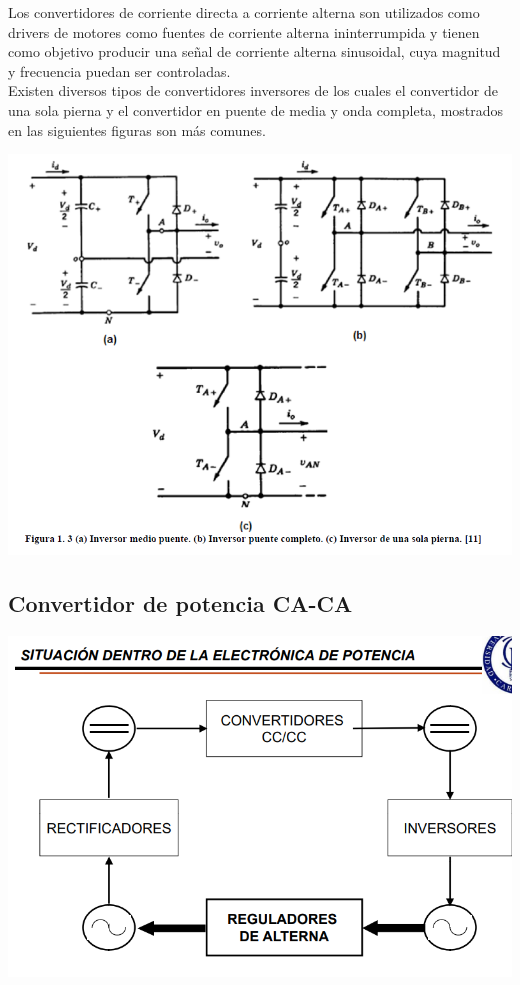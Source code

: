 \documentclass[12pt,a4paper]{article}
\begin{document}
Los convertidores de corriente directa a corriente alterna son utilizados como drivers de motores como fuentes de corriente alterna ininterrumpida y tienen como objetivo producir una señal de corriente alterna sinusoidal, cuya magnitud y frecuencia puedan ser controladas. \\
Existen diversos tipos de convertidores inversores de los cuales el convertidor de una sola pierna y el convertidor en puente de media y onda completa, mostrados en las siguientes figuras son más comunes.\\
\begin{center}
\includegraphics[scale=0.8]{imagenes/dcac1.PNG} 
\end{center}
\newpage
\begin{center}
\section{Convertidor de potencia CA-CA}
\includegraphics[scale=0.8]{imagenes/caca.PNG} 
\end{center}
\end{document}
